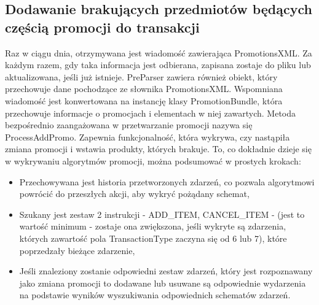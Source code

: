\documentclass[a4paper]{book}
\begin{document}
\subsection{Dodawanie brakujących przedmiotów będących częścią promocji do transakcji}
Raz w ciągu dnia, otrzymywana jest wiadomość zawierająca PromotionsXML. Za każdym razem, gdy taka informacja jest odbierana, zapisana zostaje do pliku lub aktualizowana, jeśli już istnieje. PreParser zawiera również obiekt, który przechowuje dane pochodzące ze słownika PromotionsXML. Wspomniana wiadomość jest konwertowana na instancję klasy PromotionBundle, która przechowuje informacje o promocjach i elementach w niej zawartych. Metoda bezpośrednio zaangażowana w przetwarzanie promocji nazywa się ProcessAddPromo. Zapewnia funkcjonalność, która wykrywa, czy nastąpiła zmiana promocji i wstawia produkty, których brakuje. To, co dokładnie dzieje się w wykrywaniu algorytmów promocji, można podsumować w prostych krokach:
\begin{itemize}
	\item Przechowywana jest historia przetworzonych zdarzeń, co pozwala algorytmowi powrócić do przeszłych akcji, aby wykryć pożądany schemat,
	\item Szukany jest zestaw 2 instrukcji - ADD\_ITEM, CANCEL\_ITEM - (jest to wartość minimum - zostaje ona zwiększona, jeśli wykryte są zdarzenia, których zawartość pola TransactionType zaczyna się od 6 lub 7), które poprzedzały bieżące zdarzenie,
	\item Jeśli znaleziony zostanie odpowiedni zestaw zdarzeń, który jest rozpoznawany jako zmiana promocji to dodawane lub usuwane są odpowiednie wydarzenia na podstawie wyników wyszukiwania odpowiednich schematów zdarzeń.
\end{itemize}
\end{document}
